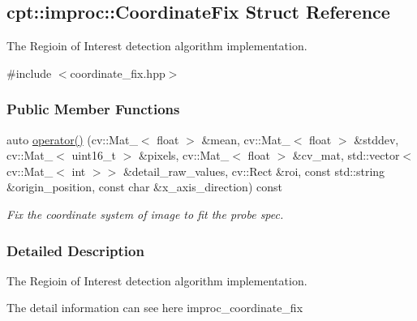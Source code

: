 \hypertarget{structcpt_1_1improc_1_1_coordinate_fix}{\subsection{cpt\-:\-:improc\-:\-:Coordinate\-Fix Struct Reference}
\label{structcpt_1_1improc_1_1_coordinate_fix}
}


The Regioin of Interest detection algorithm implementation.  




{\ttfamily \#include $<$coordinate\-\_\-fix.\-hpp$>$}

\subsubsection*{Public Member Functions}
\begin{DoxyCompactItemize}
\item 
auto \hyperlink{structcpt_1_1improc_1_1_coordinate_fix_ac012f868880fba38b5416f7d28676dae}{operator()} (cv\-::\-Mat\-\_\-$<$ float $>$ \&mean, cv\-::\-Mat\-\_\-$<$ float $>$ \&stddev, cv\-::\-Mat\-\_\-$<$ uint16\-\_\-t $>$ \&pixels, cv\-::\-Mat\-\_\-$<$ float $>$ \&cv\-\_\-mat, std\-::vector$<$ cv\-::\-Mat\-\_\-$<$ int $>$$>$ \&detail\-\_\-raw\-\_\-values, cv\-::\-Rect \&roi, const std\-::string \&origin\-\_\-position, const char \&x\-\_\-axis\-\_\-direction) const 
\begin{DoxyCompactList}\small\item\em Fix the coordinate system of image to fit the probe spec. \end{DoxyCompactList}\end{DoxyCompactItemize}


\subsubsection{Detailed Description}
The Regioin of Interest detection algorithm implementation. 

The detail information can see here improc\-\_\-coordinate\-\_\-fix 

